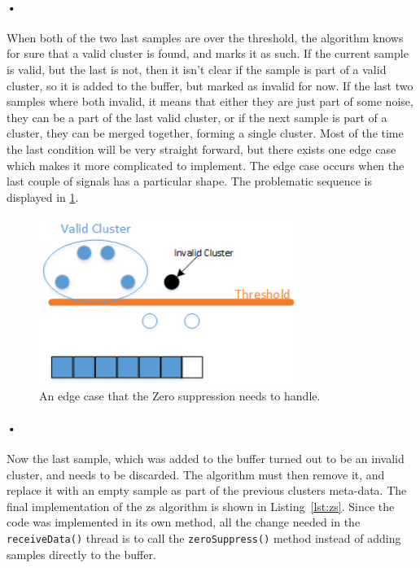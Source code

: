 \documentclass[a4paper, 12pt, openright, twoside]{report}
\newcommand{\codeword}[1]{\texttt{#1}}
\begin{document}
\paragraph{•}
When both of the two last samples are over the threshold, the algorithm knows for sure that a valid cluster is found, and marks it as such.
If the current sample is valid, but the last is not, then it isn't clear if the sample is part of a valid cluster, so it is added to the buffer, but marked as invalid for now.
If the last two samples where both invalid, it means that either they are just part of some noise, they can be a part of the last valid cluster, or if the next sample is part of a cluster, they can be merged together, forming a single cluster.
Most of the time the last condition will be very straight forward, but there exists one edge case which makes it more complicated to implement.
The edge case occurs when the last couple of signals has a particular shape.
The problematic sequence is displayed in \ref{fig:zs-prob}.

\begin{figure}[h!]
	\centering
		\includegraphics[width=0.75\textwidth]{images/zs-prob.png}
		\caption{An edge case that the Zero suppression needs to handle.}
		\label{fig:zs-prob}
\end{figure}

\paragraph{•}
Now the last sample, which was added to the buffer turned out to be an invalid cluster, and needs to be discarded.
The algorithm must then remove it, and replace it with an empty sample as part of the previous clusters meta-data.
The final implementation of the \gls{zs} algorithm is shown in Listing~\ref{lst:zs}.
Since the code was implemented in its own method, all the change needed in the \codeword{receiveData()} thread is to call the \codeword{zeroSuppress()} method instead of adding samples directly to the buffer.
\end{document}
